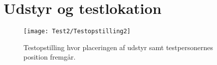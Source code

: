 \section{Udstyr og testlokation}
\label{UdstyrLokationSocialAccept}
%





%
\begin{figure}[H]
	\centering
	\texttt{[image: Test2/Testopstilling2]}
	\caption{Testopstilling hvor placeringen af udstyr samt testpersonernes position fremgår.}
	\label{fig:Testopstilling2}
\end{figure}
\noindent
% 